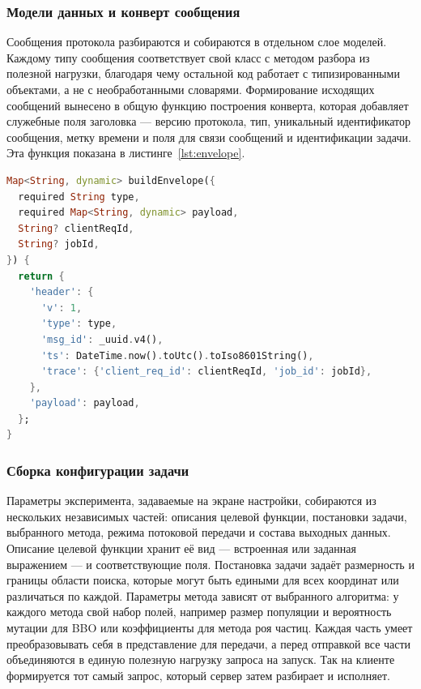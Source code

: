 \documentclass[14pt, a4paper]{extarticle}
\begin{document}
\subsubsection{Модели данных и конверт сообщения}
Сообщения протокола разбираются и
собираются в отдельном слое моделей. Каждому типу сообщения соответствует свой
класс с методом разбора из полезной нагрузки, благодаря чему остальной код работает
с типизированными объектами, а не с необработанными словарями. Формирование
исходящих сообщений вынесено в общую функцию построения конверта, которая
добавляет служебные поля заголовка --- версию протокола, тип, уникальный
идентификатор сообщения, метку времени и поля для связи сообщений и идентификации
задачи. Эта функция показана в листинге~\ref{lst:envelope}.

\begin{lstlisting}[language=Dart, caption={Построение конверта исходящего сообщения}, label={lst:envelope}]
Map<String, dynamic> buildEnvelope({
  required String type,
  required Map<String, dynamic> payload,
  String? clientReqId,
  String? jobId,
}) {
  return {
    'header': {
      'v': 1,
      'type': type,
      'msg_id': _uuid.v4(),
      'ts': DateTime.now().toUtc().toIso8601String(),
      'trace': {'client_req_id': clientReqId, 'job_id': jobId},
    },
    'payload': payload,
  };
}
\end{lstlisting}

\subsubsection{Сборка конфигурации задачи}
Параметры эксперимента, задаваемые на
экране настройки, собираются из нескольких независимых частей: описания целевой
функции, постановки задачи, выбранного метода, режима потоковой передачи и состава
выходных данных. Описание целевой функции хранит её вид --- встроенная или
заданная выражением --- и соответствующие поля. Постановка задачи задаёт
размерность и границы области поиска, которые могут быть едиными для всех
координат или различаться по каждой. Параметры метода зависят от выбранного
алгоритма: у каждого метода свой набор полей, например размер популяции и
вероятность мутации для BBO или коэффициенты для метода роя частиц. Каждая часть
умеет преобразовывать себя в представление для передачи, а перед отправкой все
части объединяются в единую полезную нагрузку запроса на запуск. Так на клиенте
формируется тот самый запрос, который сервер затем разбирает и исполняет.
\end{document}
